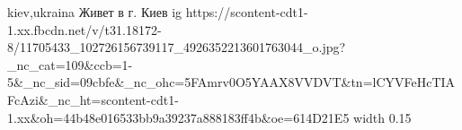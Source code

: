  
 
 
 
 

\par
kiev,ukraina
Живет в г. Киев
\ifcmt
  ig https://scontent-cdt1-1.xx.fbcdn.net/v/t31.18172-8/11705433_102726156739117_4926352213601763044_o.jpg?_nc_cat=109&ccb=1-5&_nc_sid=09cbfe&_nc_ohc=5FAmrv0O5YAAX8VVDVT&tn=lCYVFeHcTIAFcAzi&_nc_ht=scontent-cdt1-1.xx&oh=44b48e016533bb9a39237a888183ff4b&oe=614D21E5
  width 0.15
\fi

